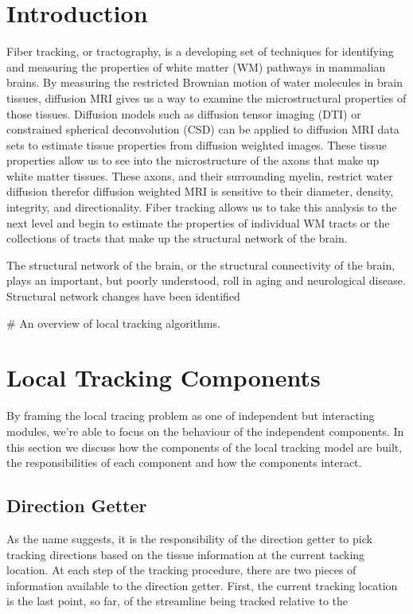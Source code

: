 \section{Introduction}
    Fiber tracking, or tractography, is a developing set of techniques for identifying and measuring the properties of white matter (WM) pathways in mammalian brains. By measuring the restricted Brownian motion of water molecules in brain tissues, diffusion MRI gives us a way to examine the microstructural properties of those tissues. Diffusion models such as diffusion tensor imaging (DTI) or constrained spherical deconvolution (CSD) can be applied to diffusion MRI data sets to estimate tissue properties from diffusion weighted images. These tissue properties allow us to see into the microstructure of the axons that make up white matter tissues. These axons, and their surrounding myelin, restrict water diffusion therefor diffusion weighted MRI is sensitive to their diameter, density, integrity, and directionality. Fiber tracking allows us to take this analysis to the next level and begin to estimate the properties of individual WM tracts or the collections of tracts that make up the structural network of the brain.
    
    The structural network of the brain, or the structural connectivity of the brain, plays an important, but poorly understood, roll in aging and neurological disease. Structural network changes have been identified 

# An overview of local tracking algorithms.

\section{Local Tracking Components}
    By framing the local tracing problem as one of independent but interacting modules, we're able to focus on the behaviour of the independent components. In this section we discuss how the components of the local tracking model are built, the responsibilities of each component and how the components interact.

\subsection{Direction Getter}
    As the name suggests, it is the responsibility of the direction getter to pick tracking directions based on the tissue information at the current tacking location. At each step of the tracking procedure, there are two pieces of information available to the direction getter. First, the current tracking location is the last point, so far, of the streamline being tracked relative to the 
    
